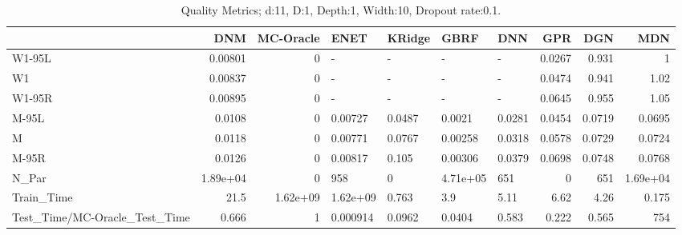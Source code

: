 \begin{table}
\centering
\caption{Quality Metrics; d:11, D:1, Depth:1, Width:10, Dropout rate:0.1.}
\begin{tabular}{lrrllllrrr}
\toprule
{} &      DNM &  MC-Oracle &     ENET & KRidge &     GBRF &    DNN &    GPR &    DGN &      MDN \\
\midrule
W1-95L                        &  0.00801 &          0 &        - &      - &        - &      - & 0.0267 &  0.931 &        1 \\
W1                            &  0.00837 &          0 &        - &      - &        - &      - & 0.0474 &  0.941 &     1.02 \\
W1-95R                        &  0.00895 &          0 &        - &      - &        - &      - & 0.0645 &  0.955 &     1.05 \\
M-95L                         &   0.0108 &          0 &  0.00727 & 0.0487 &   0.0021 & 0.0281 & 0.0454 & 0.0719 &   0.0695 \\
M                             &   0.0118 &          0 &  0.00771 & 0.0767 &  0.00258 & 0.0318 & 0.0578 & 0.0729 &   0.0724 \\
M-95R                         &   0.0126 &          0 &  0.00817 &  0.105 &  0.00306 & 0.0379 & 0.0698 & 0.0748 &   0.0768 \\
N\_Par                         & 1.89e+04 &          0 &      958 &      0 & 4.71e+05 &    651 &      0 &    651 & 1.69e+04 \\
Train\_Time                    &     21.5 &   1.62e+09 & 1.62e+09 &  0.763 &      3.9 &   5.11 &   6.62 &   4.26 &    0.175 \\
Test\_Time/MC-Oracle\_Test\_Time &    0.666 &          1 & 0.000914 & 0.0962 &   0.0404 &  0.583 &  0.222 &  0.565 &      754 \\
\bottomrule
\end{tabular}
\end{table}
